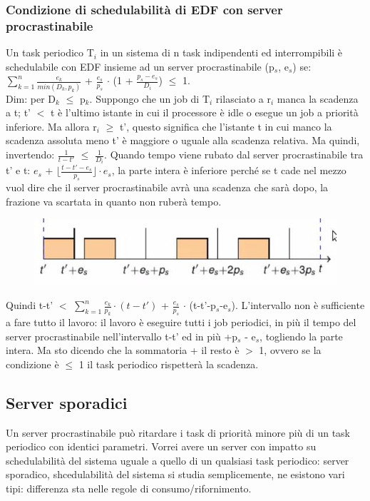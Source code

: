\documentclass[12pt, oneside]{extbook}
\begin{document}
\subsubsection{Condizione di schedulabilità di EDF con server procrastinabile}
Un task periodico T$_{i}$ in un sistema di n task indipendenti ed interrompibili è schedulabile con EDF insieme ad un server procrastinabile (p$_{s}$, e$_{s}$) se:\\ $\sum\limits_{k = 1}^{n} \frac{e_k}{min(D_k, p_k)}$ + $\frac{e_s}{p_s}$ $\cdot$ (1 + $\frac{p_s - e_s}{D_i}$) $\leq$ 1.\\ Dim: per D$_{k}$ $\leq$ p$_{k}$. Suppongo che un job di T$_{i}$ rilasciato a r$_{i}$ manca la scadenza a t; t' $<$ t è l'ultimo istante in cui il processore è idle o esegue un job a priorità inferiore. Ma allora r$_{i}$ $\geq$ t', questo significa che l'istante t in cui manco la scadenza assoluta meno t' è maggiore o uguale alla scadenza relativa. Ma quindi, invertendo: $\frac{1}{t-t'}$ $\leq$ $\frac{1}{D_i}$. Quando tempo viene rubato dal server procrastinabile tra t' e t: $e_{s}$ + $\lfloor \frac{t - t'- e_s}{p_s}\rfloor \cdot e_s$, la parte intera è inferiore perché se t cade nel mezzo vuol dire che il server procrastinabile avrà una scadenza che sarà dopo, la frazione va scartata in quanto non ruberà tempo.\\
\begin{figure}[!h]
\centering
\includegraphics[scale=0.4]{immagini/image-015.jpg}
\end{figure}
Quindi t-t' $<$ $\sum\limits_{k=1}^{n} \frac{e_k}{p_k} \cdot (t-t')$ + $\frac{e_s}{p_s}$ $\cdot$ (t-t'-p$_s$-e$_{s}$). L'intervallo non è sufficiente a fare tutto il lavoro: il lavoro è eseguire tutti i job periodici, in più il tempo del server procrastinabile nell'intervallo t-t' ed in più +p$_{s}$ - e$_{s}$, togliendo la parte intera. Ma sto dicendo che la sommatoria + il resto è $>$ 1, ovvero se la condizione è $\leq$ 1 il task periodico rispetterà la scadenza.
\subsection{Server sporadici}
Un server procrastinabile può ritardare i task di priorità minore più di un task periodico con identici parametri. Vorrei avere un server con impatto su schedulabilità del sistema uguale a quello di un qualsiasi task periodico: server sporadico, shcedulabilità del sistema si studia semplicemente, ne esistono vari tipi: differenza sta nelle regole di consumo/rifornimento.
\end{document}
